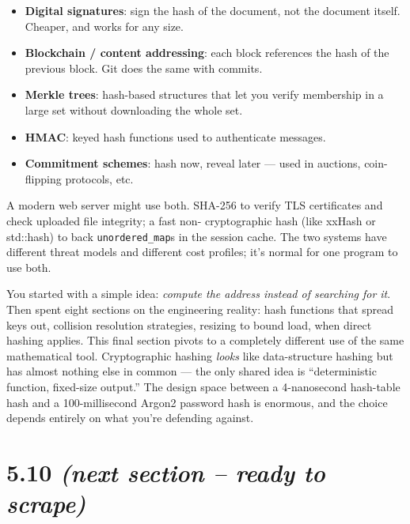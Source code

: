 \documentclass[11pt]{article}
\begin{document}
\begin{itemize}[leftmargin=*]
    \item \textbf{Digital signatures}: sign the hash of the
          document, not the document itself. Cheaper, and works
          for any size.
    \item \textbf{Blockchain / content addressing}: each block
          references the hash of the previous block. Git does
          the same with commits.
    \item \textbf{Merkle trees}: hash-based structures that let
          you verify membership in a large set without
          downloading the whole set.
    \item \textbf{HMAC}: keyed hash functions used to authenticate
          messages.
    \item \textbf{Commitment schemes}: hash now, reveal later ---
          used in auctions, coin-flipping protocols, etc.
\end{itemize}

\begin{notebox}
A modern web server might use both. SHA-256 to verify TLS
certificates and check uploaded file integrity; a fast non-
cryptographic hash (like xxHash or std::hash) to back
\texttt{unordered\_map}s in the session cache. The two systems
have different threat models and different cost profiles; it's
normal for one program to use both.
\end{notebox}

\begin{ideabox}
You started with a simple idea: \emph{compute the address instead
of searching for it}. Then spent eight sections on the
engineering reality: hash functions that spread keys out,
collision resolution strategies, resizing to bound load, when
direct hashing applies. This final section pivots to a completely
different use of the same mathematical tool. Cryptographic
hashing \emph{looks} like data-structure hashing but has almost
nothing else in common --- the only shared idea is ``deterministic
function, fixed-size output.'' The design space between a
4-nanosecond hash-table hash and a 100-millisecond Argon2 password
hash is enormous, and the choice depends entirely on what you're
defending against.
\end{ideabox}

\section{5.10 \textit{(next section -- ready to scrape)}}
\end{document}
